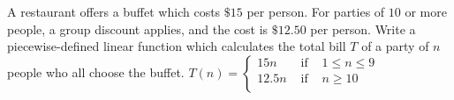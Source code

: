 {A restaurant offers a buffet which costs $\$15$ per person.  For parties of $10$ or more people, a group discount applies, and the cost is $\$12.50$ per person.   Write a piecewise-defined linear function which calculates the total bill $T$ of a party of $n$ people who all choose the buffet.}
{${\displaystyle T(n) = \left\{ \begin{array}{rcl} 15n & \mbox{ if } & 1 \leq n \leq 9 \\
                                                            12.5n & \mbox{ if } & n \geq 10 \\ 
                                     \end{array} \right. }$
}